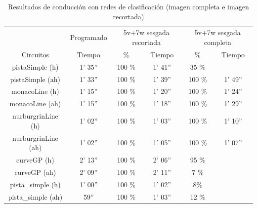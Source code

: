 \begin{table}[H]
\centering
\caption{Resultados de conducción con redes de clasificación (imagen completa e imagen recortada)}
\label{resultados_completa_recortada}
\resizebox{16cm}{!} {
\begin{tabular}{c|c|c|c|c|c|}
\cline{2-6}
                          & \multicolumn{1}{c|}{Programado} & \multicolumn{2}{c|}{5v+7w sesgada recortada} & \multicolumn{2}{c|}{5v+7w sesgada completa} \\ \cline{1-6} 
                        \multicolumn{1}{|c|}{Circuitos}    & Tiempo       & \%       & Tiempo       & \%        & Tiempo       \\ \hline 
\multicolumn{1}{|c|}{pistaSimple (h)}    & 1' 35''           & 100 \%         & 1' 41''            & 35 \%           &                 \\ \hline
\multicolumn{1}{|c|}{pistaSimple (ah)}     & 1' 33''           & 100 \%          & 1' 39''            & 100 \%           & 1' 49''               \\ \hline
\multicolumn{1}{|c|}{monacoLine (h)}      & 1' 15''           & 100 \%           & 1' 20''            & 100 \%       & 1' 24''             \\ \hline
\multicolumn{1}{|c|}{monacoLine (ah)}       & 1' 15''            & 100 \%       & 1' 18''            & 100 \%           & 1' 29''                  \\ \hline
\multicolumn{1}{|c|}{nurburgrinLine (h)}      & 1' 02''            & 100 \%          & 1' 03''            & 100 \%        & 1' 10''                 \\ \hline
\multicolumn{1}{|c|}{nurburgrinLine (ah)}       & 1' 02''           & 100 \%           & 1' 05''           & 100 \%        & 1' 07''              \\ \hline
\multicolumn{1}{|c|}{curveGP (h)}     & 2' 13''           & 100 \%           & 2' 06''            & 95 \%        &                  \\ \hline
\multicolumn{1}{|c|}{curveGP (ah)}       & 2' 09''            & 100 \%         & 2' 11''            & 7 \%        &            \\ \hline
\multicolumn{1}{|c|}{pista\_simple (h)}       & 1' 00''           & 100 \%          & 1' 02''            & 8\%        &              \\ \hline
\multicolumn{1}{|c|}{pista\_simple (ah)}     & 59''            & 100 \%          & 1' 03''          & 12 \%        &                  \\ \hline
\end{tabular}
}
\end{table}


